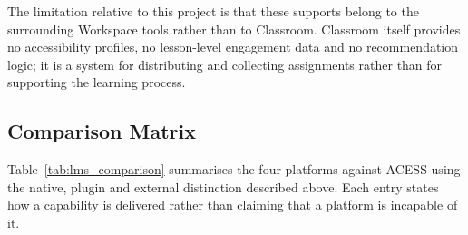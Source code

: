 \documentclass[12pt, oneside]{article} %
\begin{document}
The limitation relative to this project is that these supports belong to the surrounding Workspace tools rather than to Classroom. Classroom itself provides no accessibility profiles, no lesson-level engagement data and no recommendation logic; it is a system for distributing and collecting assignments rather than for supporting the learning process.

\subsection{Comparison Matrix}

Table~\ref{tab:lms_comparison} summarises the four platforms against ACESS using the native, plugin and external distinction described above. Each entry states how a capability is delivered rather than claiming that a platform is incapable of it.
\end{document}
